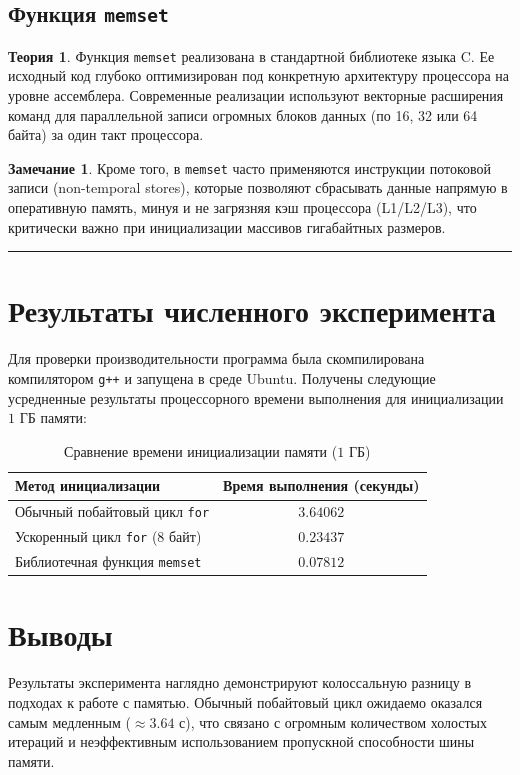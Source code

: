 \documentclass[12pt, a4paper]{article}
\theoremstyle{definition}
\newtheorem*{theory}{Теория}
\newtheorem*{remark}{Замечание}
\begin{document}
\subsection{Функция \texttt{memset}}
\begin{theory}
Функция \texttt{memset} реализована в стандартной библиотеке языка C. Ее исходный код глубоко оптимизирован под конкретную архитектуру процессора на уровне ассемблера. Современные реализации используют векторные расширения команд для параллельной записи огромных блоков данных (по 16, 32 или 64 байта) за один такт процессора.
\end{theory}
\begin{remark}
Кроме того, в \texttt{memset} часто применяются инструкции потоковой записи (non-temporal stores), которые позволяют сбрасывать данные напрямую в оперативную память, минуя и не загрязняя кэш процессора (L1/L2/L3), что критически важно при инициализации массивов гигабайтных размеров.
\end{remark}

\hrule\vspace{0.5cm}

\section{Результаты численного эксперимента}
Для проверки производительности программа была скомпилирована компилятором \texttt{g++} и запущена в среде Ubuntu. Получены следующие усредненные результаты процессорного времени выполнения для инициализации $1$ ГБ памяти:

\begin{table}[h]
    \centering
    \begin{tabular}{|l|c|}
        \hline
        \textbf{Метод инициализации} & \textbf{Время выполнения (секунды)} \\
        \hline
        Обычный побайтовый цикл \texttt{for} & $3.64062$ \\
        Ускоренный цикл \texttt{for} (8 байт) & $0.23437$ \\
        Библиотечная функция \texttt{memset} & $0.07812$ \\
        \hline
    \end{tabular}
    \vspace{0.2cm}
    \caption{Сравнение времени инициализации памяти ($1$ ГБ)}
\end{table}

\section{Выводы}
Результаты эксперимента наглядно демонстрируют колоссальную разницу в подходах к работе с памятью. Обычный побайтовый цикл ожидаемо оказался самым медленным ($\approx 3.64$ с), что связано с огромным количеством холостых итераций и неэффективным использованием пропускной способности шины памяти.
\end{document}
